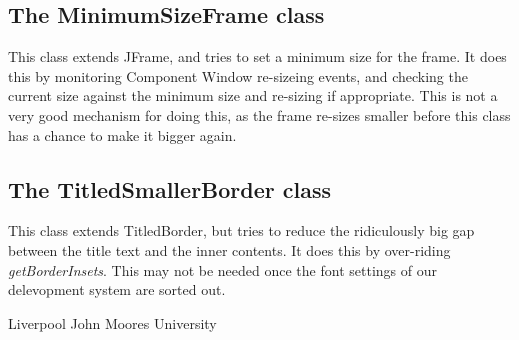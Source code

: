 \documentclass[10pt,a4paper]{article}
\begin{document}
\subsection{The MinimumSizeFrame class}
This class extends JFrame, and tries to set a minimum size for the frame.
It does this by monitoring Component Window re-sizeing events, and checking the current size	
against the minimum size and re-sizing if appropriate. This is not a very good mechanism
for doing this, as the frame re-sizes smaller before this class has a chance to make it bigger again.

\subsection{The TitledSmallerBorder class}
This class extends TitledBorder, but tries to reduce the ridiculously big gap between
the title text and the inner contents. It does this by over-riding {\em getBorderInsets}.
This may not be needed once the font settings of our delevopment system are sorted out.

\begin{thebibliography}{99}
Liverpool John Moores University 
\end{thebibliography}
\end{document}
